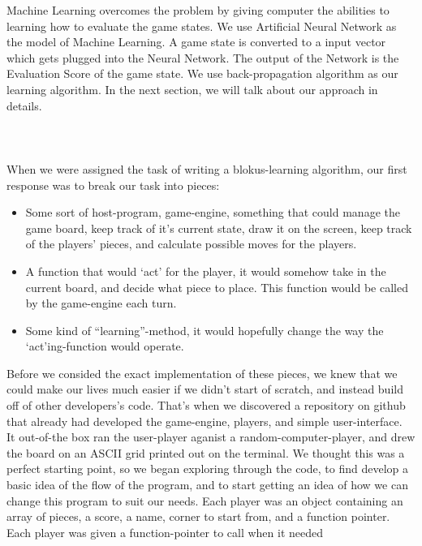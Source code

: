 \documentclass{report}
\begin{document}
	Machine Learning overcomes the problem by giving computer the abilities to learning how to evaluate the game states. We use Artificial Neural Network as the model of Machine Learning. A
	game state is converted to a input vector which gets plugged into the Neural Network. The output of the Network is the Evaluation Score of the game state. We use back-propagation algorithm
	as our learning algorithm. In the next section, we will talk about our approach in details.\\

	\\
	\blindtext\\
	
	\\
	When we were assigned the task of writing a blokus-learning algorithm, our first response was to break our task into pieces:
	\begin{itemize}
		\item Some sort of host-program, game-engine, something that could manage the game board, keep track of it's current state, draw it on the screen, keep track of the players' pieces,
			and calculate possible moves for the players.
		\item A function that would `act' for the player, it would somehow take in the current board, and decide what piece to place. This function would be called by the game-engine each
			turn.
		\item Some kind of ``learning''-method, it would hopefully change the way the `act'ing-function would operate.
	\end{itemize}
	Before we consided the exact implementation of these pieces, we knew that we could make our lives much easier if we didn't start of scratch, and instead build off of other developers's code.
	That's when we discovered a repository on github that already had developed the game-engine, players, and simple user-interface.\\
	It out-of-the box ran the user-player aganist a random-computer-player, and drew the board on an ASCII grid printed out on the terminal. We thought this was a perfect starting point,
	so we began exploring through the code, to find develop	a basic idea of the flow of the program, and to start getting an idea of how we can change this program to suit our needs.
	Each player was an object containing an array of pieces, a score, a name, corner to start from, and a function pointer. Each player was given a function-pointer to call when it needed
\end{document}
